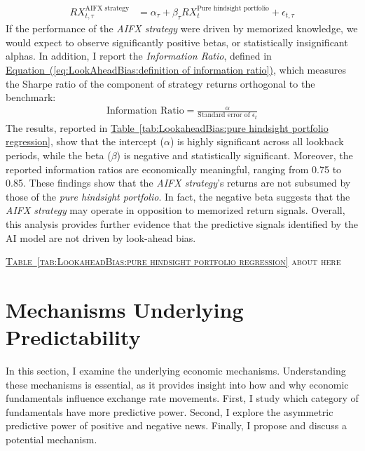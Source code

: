 \documentclass[12pt,oneside,letter]{article}
\newcommand*{\mytab}[1]{\hyperref[{#1}]{Table~\ref*{#1}}}
\newcommand*{\myeq}[1]{\hyperref[{#1}]{Equation~(\ref*{#1})}}
\begin{document}
		\begin{align}
			RX_{t,\tau}^{\text{AIFX strategy}} &= \alpha_{\tau} + \beta_{\tau} RX^\text{Pure hindsight portfolio}_{t}  + \epsilon_{t,\tau}
			\label{eq:LookAheadBias:regression ai strategy on pure hindsight strategy}
		\end{align}
		If the performance of the \textit{AIFX strategy} were driven by memorized knowledge, we would expect to observe significantly positive betas, or statistically insignificant alphas. In addition, I report the \textit{Information Ratio}, defined in \myeq{eq:LookAheadBias:definition of information ratio}, which measures the Sharpe ratio of the component of strategy returns orthogonal to the benchmark:
		\begin{align}
			\text{Information Ratio} = \frac{\alpha}{\text{Standard error of }\epsilon_t}
			\label{eq:LookAheadBias:definition of information ratio}
		\end{align}
		The results, reported in \mytab{tab:LookaheadBias:pure hindsight portfolio regression}, show that the intercept (\(\alpha\)) is highly significant across all lookback periods, while the beta (\(\beta\)) is negative and statistically significant. Moreover, the reported information ratios are economically meaningful, ranging from 0.75 to 0.85. These findings show that the \textit{AIFX strategy}’s returns are not subsumed by those of the \textit{pure hindsight portfolio}. In fact, the negative beta suggests that the \textit{AIFX strategy} may operate in opposition to memorized return signals. Overall, this analysis provides further evidence that the predictive signals identified by the AI model are not driven by look-ahead bias.
		\begin{center}
			\textsc{\mytab{tab:LookaheadBias:pure hindsight portfolio regression} about here} \vspace{0cm}
		\end{center} 
		\section{Mechanisms Underlying Predictability} 				\label{sec:Mechanism}
		In this section, I examine the underlying economic mechanisms. Understanding these mechanisms is essential, as it provides insight into how and why economic fundamentals influence exchange rate movements. First, I study which category of fundamentals have more predictive power. Second, I explore the asymmetric predictive power of positive and negative news. Finally, I propose and discuss a potential mechanism.
\end{document}
